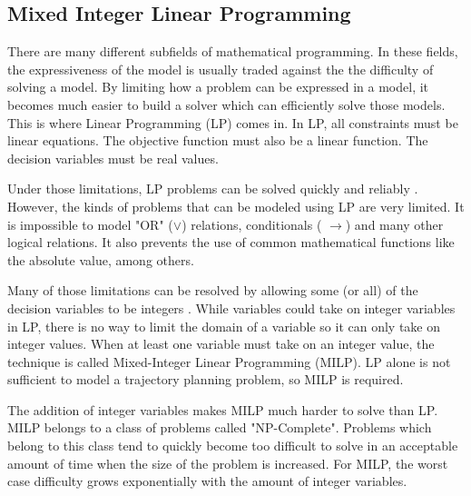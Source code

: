 \subsection{Mixed Integer Linear Programming}
There are many different subfields of mathematical programming. In these fields, the expressiveness of the model is usually traded against the the difficulty of solving a model. By limiting how a problem can be expressed in a model, it becomes much easier to build a solver which can efficiently solve those models. This is where Linear Programming (LP) comes in. In LP, all constraints must be linear equations. The objective function must also be a linear function. The decision variables must be real values.
\par
Under those limitations, LP problems can be solved quickly and reliably \cite{Dantzig1963}. However, the kinds of problems that can be modeled using LP are very limited. It is impossible to model "OR" ($\vee$) relations, conditionals ( $\rightarrow$) and many other logical relations. It also prevents the use of common mathematical functions like the absolute value, among others.
\par
Many of those limitations can be resolved by allowing some (or all) of the decision variables to be integers \cite{Mitra1994}. While variables could take on integer variables in LP, there is no way to limit the domain of a variable so it can only take on integer values. When at least one variable must take on an integer value, the technique is called Mixed-Integer Linear Programming (MILP). LP alone is not sufficient to model a trajectory planning problem, so MILP is required.
\par
The addition of integer variables makes MILP much harder to solve than LP. MILP belongs to a class of problems called "NP-Complete". Problems which belong to this class tend to quickly become too difficult to solve in an acceptable amount of time when the size of the problem is increased. For MILP, the worst case difficulty grows exponentially with the amount of integer variables.
